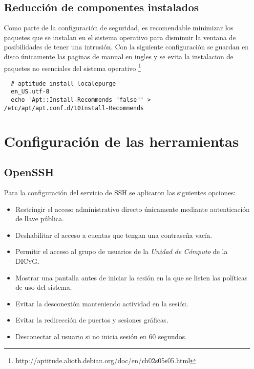       \subsection {Reducci\'{o}n de componentes instalados}

Como parte de la configuraci\'{o}n de seguridad, es recomendable minimizar los paquetes que se instalan en el sistema operativo para disminuir la ventana de posibilidades de tener una intrusi\'{o}n. Con la siguiente configuraci\'{o}n se guardan en disco \'{u}nicamente las paginas de manual en ingles y se evita la instalacion de paquetes no esenciales del sistema operativo \footnote{http://aptitude.alioth.debian.org/doc/en/ch02s05s05.html}

{
\scriptsize
\linespread{1}
\begin{verbatim}
  # aptitude install localepurge
  en_US.utf-8
  echo 'Apt::Install-Recommends "false"' > /etc/apt/apt.conf.d/10Install-Recommends
\end{verbatim}
}

    \section {Configuraci\'{o}n de las herramientas}

      \subsection {OpenSSH}

Para la configuraci\'{o}n del servicio de \textsc{SSH} se aplicaron las siguientes opciones:

\begin{itemize}
  \item Restringir el acceso administrativo directo \'{u}nicamente mediante autenticaci\'{o}n de llave p\'{u}blica.
  \item Deshabilitar el acceso a cuentas que tengan una contrase\~{n}a vac\'{i}a.
  \item Permitir el acceso al grupo de usuarios de la \textit{Unidad de C\'{o}mputo} de la \textsc{DICyG}.
  \item  Mostrar una pantalla antes de iniciar la sesi\'{o}n en la que se listen las pol\'{i}ticas de uso del sistema.
  \item Evitar la desconexi\'{o}n manteniendo actividad en la sesi\'{o}n.
  \item Evitar la redirecci\'{o}n de puertos y sesiones gr\'{a}ficas.
  \item Desconectar al usuario si no inicia sesi\'{o}n en 60 segundos.
\end{itemize}

